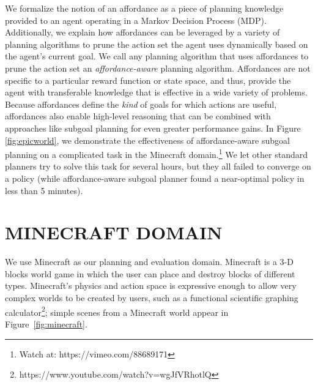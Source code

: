 \documentclass[]{article}
\begin{document}
      We formalize the notion of an affordance as a piece of planning
      knowledge provided to an agent operating in a Markov Decision
      Process (MDP). Additionally, we explain how affordances can be leveraged by a
      variety of planning algorithms to prune the action set the agent
      uses dynamically based on the agent's current goal.  We call any
      planning algorithm that uses affordances to prune the action set
      an {\it affordance-aware} planning algorithm.  Affordances are
      not specific to a particular reward function or state space, and thus,
      provide the agent with transferable knowledge that is effective
      in a wide variety of problems. Because affordances
      define the {\em kind} of goals for which actions are useful,
      affordances also enable high-level reasoning that can
      be combined with approaches like subgoal planning for even
      greater performance gains. In Figure \ref{fig:epicworld}, we demonstrate the effectiveness of
      affordance-aware subgoal planning on a complicated task
      in the Minecraft domain.\footnote{Watch at: https://vimeo.com/88689171}
      We let other standard planners try to solve this task for several hours, but they all failed
      to converge on a policy (while affordance-aware subgoal planner found a near-optimal
      policy in less than 5 minutes).





\section{MINECRAFT DOMAIN}
We use Minecraft as our planning and evaluation domain. Minecraft is a
3-D blocks world game in which the user can place and destroy blocks
of different types.  Minecraft's physics and action space is expressive
enough to allow very complex worlds to be created by users, such as a
functional scientific graphing calculator\footnote{https://www.youtube.com/watch?v=wgJfVRhotlQ};
simple scenes from a Minecraft world appear in Figure~\ref{fig:minecraft}.  
\end{document}
